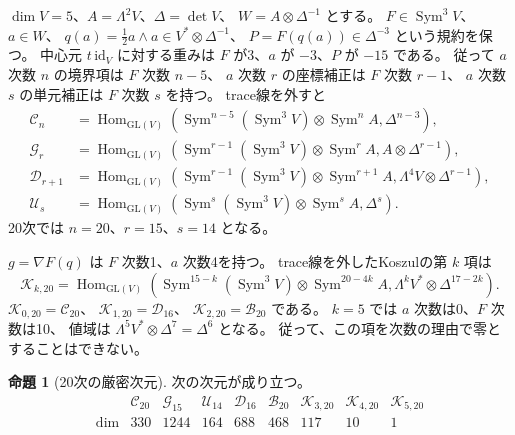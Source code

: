 \documentclass[a4paper,11pt]{ltjsarticle}
\theoremstyle{definition}
\newtheorem{proposition}[theorem]{命題}
\begin{document}
$\dim V=5$、$A=\Lambda^2V$、$\Delta=\det V$、
$W=A\otimes\Delta^{-1}$ とする。
$F\in\operatorname{Sym}^3V$、$a\in W$、
$q(a)=\tfrac12a\wedge a\in V^*\otimes\Delta^{-1}$、
$P=F(q(a))\in\Delta^{-3}$ という規約を保つ。
中心元 $t\,\mathrm{id}_V$ に対する重みは
$F$ が3、$a$ が $-3$、$P$ が $-15$ である。
従って $a$ 次数 $n$ の境界項は $F$ 次数 $n-5$、
$a$ 次数 $r$ の座標補正は $F$ 次数 $r-1$、
$a$ 次数 $s$ の単元補正は $F$ 次数 $s$ を持つ。
trace線を外すと
\begin{align*}
\mathcal C_n&=\operatorname{Hom}_{\mathrm{GL}(V)}
 \left(\operatorname{Sym}^{n-5}(\operatorname{Sym}^3V)
 \otimes\operatorname{Sym}^n A,\Delta^{n-3}\right),\\
\mathcal G_r&=\operatorname{Hom}_{\mathrm{GL}(V)}
 \left(\operatorname{Sym}^{r-1}(\operatorname{Sym}^3V)
 \otimes\operatorname{Sym}^r A,A\otimes\Delta^{r-1}\right),\\
\mathcal D_{r+1}&=\operatorname{Hom}_{\mathrm{GL}(V)}
 \left(\operatorname{Sym}^{r-1}(\operatorname{Sym}^3V)
 \otimes\operatorname{Sym}^{r+1}A,\Lambda^4V\otimes\Delta^{r-1}\right),\\
\mathcal U_s&=\operatorname{Hom}_{\mathrm{GL}(V)}
 \left(\operatorname{Sym}^{s}(\operatorname{Sym}^3V)
 \otimes\operatorname{Sym}^{s}A,\Delta^{s}\right).
\end{align*}
20次では $n=20$、$r=15$、$s=14$ となる。

$g=\nabla F(q)$ は $F$ 次数1、$a$ 次数4を持つ。
trace線を外したKoszulの第 $k$ 項は
\begin{equation}\label{eq:v15-koszul-term}
\mathcal K_{k,20}=
\operatorname{Hom}_{\mathrm{GL}(V)}
\left(\operatorname{Sym}^{15-k}(\operatorname{Sym}^3V)
 \otimes\operatorname{Sym}^{20-4k} A,
 \Lambda^k V^*\otimes\Delta^{17-2k}\right).
\end{equation}
$\mathcal K_{0,20}=\mathcal C_{20}$、
$\mathcal K_{1,20}=\mathcal D_{16}$、
$\mathcal K_{2,20}=\mathcal B_{20}$ である。
$k=5$ では $a$ 次数は0、$F$ 次数は10、
値域は $\Lambda^5V^*\otimes\Delta^7=\Delta^6$ となる。
従って、この項を次数の理由で零とすることはできない。

\begin{proposition}[20次の厳密次元]\label{prop:v15-twentieth-dimensions}
次の次元が成り立つ。
\[
\begin{array}{c|rrrrrrrr}
 &\mathcal C_{20}&\mathcal G_{15}&\mathcal U_{14}&\mathcal D_{16}
 &\mathcal B_{20}&\mathcal K_{3,20}&\mathcal K_{4,20}&\mathcal K_{5,20}\\\hline
\dim&330&1244&164&688&468&117&10&1
\end{array}
\]
\end{proposition}
\end{document}
